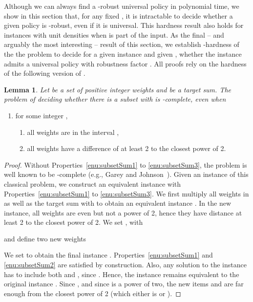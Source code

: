 \documentclass[11pt]{article}
\newtheorem{lemma}[theorem]{Lemma}
\begin{document}
Although we can always find a -robust universal policy in polynomial
time, we show in this section that, for any fixed ,
it is intractable to decide whether a given policy is -robust,
even if it is universal. This hardness result also holds for instances
with unit densities when  is part of the input. As the final
-- and arguably the most interesting -- result of this section, we
establish -hardness of the the problem to decide for
a given instance and given , whether the instance admits
a universal policy with robustness factor . All proofs rely
on the hardness of the following version of .
\begin{lemma}
\label{lem:subset_sum}Let  be a set
of positive integer weights and  be a target
sum. The problem of deciding whether there is a subset 
with  is -complete, even when\end{lemma}
\begin{enumerate}
\item  for some integer ,\label{enu:subsetSum1}

\begin{enumerate}
\item all weights are in the interval ,\label{enu:subsetSum2}
\item all weights have a difference of at least 2 to the closest power of
2.\label{enu:subsetSum3}
\end{enumerate}
\end{enumerate}
\begin{proof}
Without Properties~\ref{enu:subsetSum1} to \ref{enu:subsetSum3},
the  problem is well known to be -complete
(e.g., Garey and Johnson~\cite{gareyJ79}). Given an instance 
of this classical problem, we construct an equivalent instance with
Properties~\ref{enu:subsetSum1} to \ref{enu:subsetSum3}. We first
multiply all weights in  as well as the target sum  with 
to obtain an equivalent instance . In the new instance,
all weights are even but not a power of 2, hence they have distance
at least 2 to the closest power of 2. We set , with

and define two new weights

We set  to obtain the final instance .
Properties~\ref{enu:subsetSum1} and \ref{enu:subsetSum2} are satisfied
by construction. Also, any solution to the instance  has
to include both  and , since .
Hence, the instance remains equivalent to the original instance .
Since , and since  is a power of two, the new
items  and  are far enough from the closest power of 2 (which
either is  or ).
\end{proof}
\end{document}
